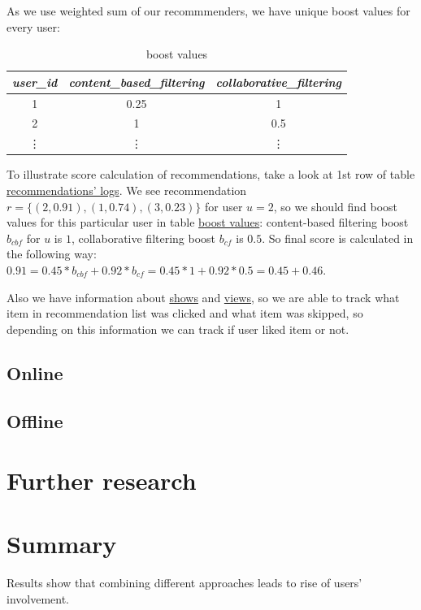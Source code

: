 \documentclass{article}
\begin{document}
    As we use weighted sum of our recommmenders, we have unique boost values for every user:

    \begin{table}[h]
        \centering
        \begin{tabular}{ccc}
            \toprule
            \textit{user\_id} & \textit{content\_based\_filtering} & \textit{collaborative\_filtering} \\
            \midrule
            1                 & 0.25                                  & 1                               \\
            2                 & 1                               & 0.5                                \\
            \vdots & \vdots & \vdots \\
            \bottomrule
            \end{tabular}%
        \caption{boost values}
        \label{tab:boost_values}
    \end{table}

    To illustrate score calculation of recommendations, take a look at 1st row of table \hyperref[tab:recommendation_logs]{recommendations' logs}. We see recommendation $r = \{(2, 0.91), (1, 0.74), (3, 0.23)\}$ for user $u = 2$, so we should find boost values for this particular user in table \hyperref[tab:boost_values]{boost values}: content-based filtering boost $b_{cbf}$ for $u$ is $1$, collaborative filtering boost $b_{cf}$ is $0.5$. So final score is calculated in the following way: $0.91 = 0.45 * b_{cbf} + 0.92 * b_{cf} = 0.45 * 1 + 0.92 * 0.5 = 0.45 + 0.46$.

    Also we have information about \hyperref[tab:show]{shows} and \hyperref[tab:view]{views}, so we are able to track what item in recommendation list was clicked and what item was skipped, so depending on this information we can track if user liked item or not.



\subsection{Online}

\subsection{Offline}

\section{Further research}
\label{sec:further}

\section{Summary}
\label{sec:summary}

    Results show that combining different approaches leads to rise of users' involvement.

    


  
\end{document}
